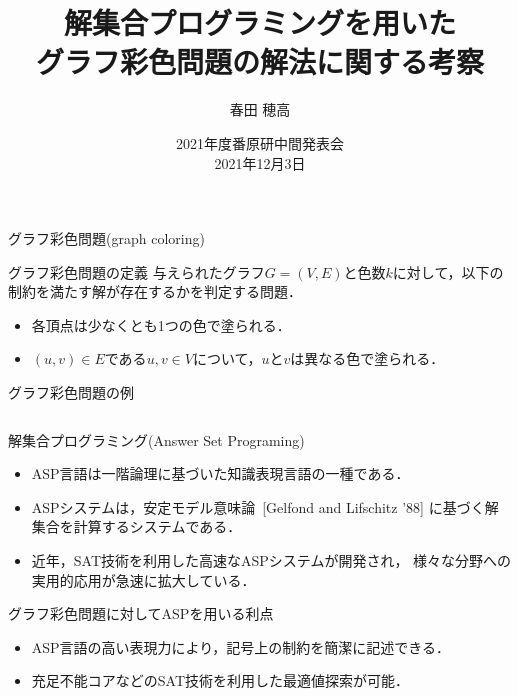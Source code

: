 \documentclass[dvipdfmx,11pt]{beamer}
\title{解集合プログラミングを用いた\\グラフ彩色問題の解法に関する考察}
\author{春田 穂高}
\date{2021年度番原研中間発表会\\2021年12月3日}
\institute{番原研究室}
\begin{document}
\begin{frame}{}
 \titlepage
\end{frame}


\begin{frame}{グラフ彩色問題(graph coloring)}
 \begin{block}{グラフ彩色問題の定義}
  与えられたグラフ$G=(V,E)$と色数$k$に対して，以下の制約を満たす解が存在するかを判定する問題．
  \begin{itemize}
   \item 各頂点は少なくとも1つの色で塗られる．
   \item $(u,v) \in E$である$u,v \in V$について，$u$と$v$は異なる色で塗られる．
  \end{itemize}
 \end{block}

 \begin{exampleblock}{グラフ彩色問題の例}
  \begin{columns}
   \begin{column}{0.50\textwidth}
    \centering
    
   \end{column}
  \end{columns}
 \end{exampleblock}
\end{frame}


\begin{frame}{解集合プログラミング(Answer Set Programing)}
 \begin{itemize}
  \item ASP言語は一階論理に基づいた知識表現言語の一種である．
  \item ASPシステムは，安定モデル意味論~[Gelfond and Lifschitz '88]
        に基づく解集合を計算するシステムである．
  \item 近年，SAT技術を利用した高速なASPシステムが開発され，
        様々な分野への実用的応用が急速に拡大している．
 \end{itemize}
 \begin{alertblock}{グラフ彩色問題に対してASPを用いる利点}
  \begin{itemize}
   \item ASP言語の高い表現力により，記号上の制約を簡潔に記述できる．
   \item 充足不能コアなどのSAT技術を利用した最適値探索が可能．
  \end{itemize}
 \end{alertblock}
\end{frame}
\end{document}
